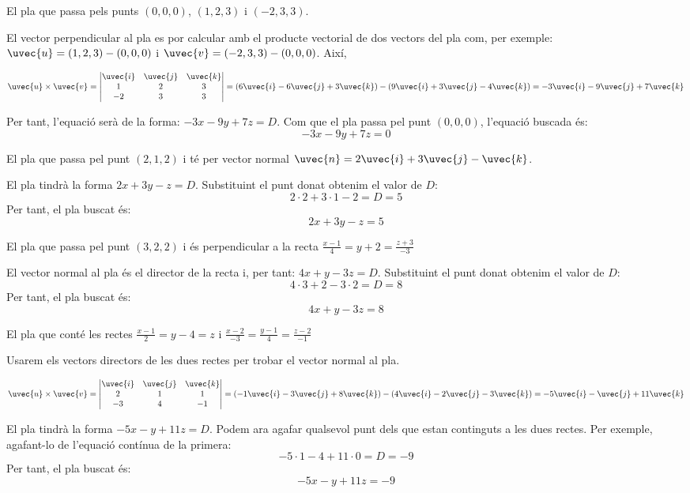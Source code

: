 \begin{llista}
  \item El pla que passa pels punts $(0,0,0)$, $(1,2,3)$ i $(-2,3,3)$.

El vector perpendicular al pla es por calcular amb el producte vectorial de dos vectors del pla com, per exemple: $\uvec{u}=(1,2,3)-(0,0,0)$ i $\uvec{v}=(-2,3,3)-(0,0,0)$. Així,

\[
\uvec{u} \times \uvec{v}=
\begin{vmatrix}
\uvec{i} & \uvec{j} & \uvec{k} \\
1 & 2 & 3\\
-2 & 3 & 3
\end{vmatrix}=
(6\uvec{i}-6\uvec{j}+3\uvec{k})-(9\uvec{i}+3\uvec{j}-4\uvec{k})=-3\uvec{i}-9\uvec{j}+7\uvec{k}
\]

Per tant, l'equació serà de la forma: $-3x-9y+7z=D$. Com que el pla passa pel punt $(0,0,0)$, l'equació buscada és:
\[
-3x-9y+7z=0
\]

  \item El pla que passa pel punt $(2,1,2)$ i té per vector normal $\uvec{n}=2\uvec{i}+3\uvec{j}-\uvec{k}$.

El pla tindrà la forma $2x+3y-z=D$. Substituint el punt donat obtenim el valor de $D$:
\[
2\cdot2+3\cdot1-2=D=5
\]
Per tant, el pla buscat és:
\[
2x+3y-z=5
\]

  \item El pla que passa pel punt $(3,2,2)$ i és perpendicular a la recta $\frac{x-1}{4}=y+2=\frac{z+3}{-3}$

El vector normal al pla és el director de la recta i, per tant: $4x+y-3z=D$. Substituint el punt donat obtenim el valor de $D$:
\[
4\cdot3+2-3\cdot2=D=8
\]
Per tant, el pla buscat és:
\[
4x+y-3z=8
\]

  \item El pla que conté les rectes $\frac{x-1}{2}=y-4=z$ i $\frac{x-2}{-3}=\frac{y-1}{4}=\frac{z-2}{-1}$

Usarem els  vectors directors de les dues rectes per trobar el vector normal al pla.

\[
\uvec{u} \times \uvec{v}=
\begin{vmatrix}
\uvec{i} & \uvec{j} & \uvec{k} \\
2 & 1 & 1\\
-3 & 4 & -1
\end{vmatrix}=
(-1\uvec{i}-3\uvec{j}+8\uvec{k})-(4\uvec{i}-2\uvec{j}-3\uvec{k})=-5\uvec{i}-\uvec{j}+11\uvec{k}
\]

El pla tindrà la forma $-5x-y+11z=D$. Podem ara agafar qualsevol punt dels que estan continguts a les dues rectes. Per exemple, agafant-lo de l'equació contínua de la primera:
\[
-5\cdot1-4+11\cdot0=D=-9
\]
Per tant, el pla buscat és:
\[
-5x-y+11z=-9
\]




\end{llista}
